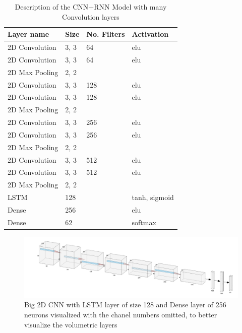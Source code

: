 \documentclass[12pt]{article}
\theoremstyle{definition}
\begin{document}
	\begin{table}[h]
		\centering
		\renewcommand{\arraystretch}{1.5}

		\caption{Description of the CNN+RNN Model with many Convolution layers}
		\label{table:big-CNN-LSTM}

		\begin{tabularx}{\textwidth}{XXXX}
			\textbf{Layer name} & \textbf{Size} & \textbf{No. Filters} & \textbf{Activation} \\ \hline
			2D Convolution & 3, 3 & 64                   & elu                  \\ \hline
			2D Convolution & 3, 3 & 64                   & elu                  \\ \hline
			2D Max Pooling & 2, 2 & \textbf{\textendash} & \textbf{\textendash} \\ \hline
			2D Convolution & 3, 3 & 128                  & elu                  \\ \hline
			2D Convolution & 3, 3 & 128                  & elu                  \\ \hline
			2D Max Pooling & 2, 2 & \textbf{\textendash} & \textbf{\textendash} \\ \hline
			2D Convolution & 3, 3 & 256                  & elu                  \\ \hline
			2D Convolution & 3, 3 & 256                  & elu                  \\ \hline
			2D Max Pooling & 2, 2 & \textbf{\textendash} & \textbf{\textendash} \\ \hline
			2D Convolution & 3, 3 & 512                  & elu                  \\ \hline
			2D Convolution & 3, 3 & 512                  & elu                  \\ \hline
			2D Max Pooling & 2, 2 & \textbf{\textendash} & \textbf{\textendash} \\ \hline
			LSTM           & 128  & \textbf{\textendash} & tanh, sigmoid        \\ \hline
			Dense          & 256  & \textbf{\textendash} & elu                  \\ \hline
			Dense          & 62   & \textbf{\textendash} & softmax              \\
		\end{tabularx}
	\end{table}

	\begin{figure}
		\includegraphics[width=\textwidth]{big-2D-CNN-LSTM-Dense.png}
		\caption{Big 2D CNN with LSTM layer of size 128 and Dense layer of 256 neurons visualized with the chanel numbers omitted, to better visualize the volumetric layers}
		\label{figure:big-2D-CNN-LSTM-Dense}
	\end{figure}
\end{document}
